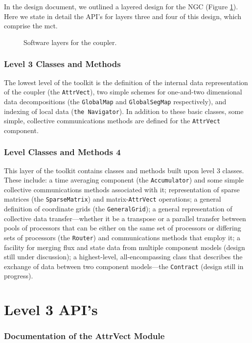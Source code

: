\documentclass{article}
\begin{document}
In the design document, we outlined a layered design for the 
NGC (Figure \ref{fig:coupler-layers}).  Here we state in detail 
the API's for layers three and four of this design, which comprise 
the mct.

\begin{figure}
\epsfxsize=6.0in
\centerline{ }
\caption{Software layers for the coupler.}
\label{fig:coupler-layers}
\end{figure}

\section{Level 3 Classes and Methods}
The lowest level of the toolkit is the definition of the internal 
data representation of the coupler (the {\tt AttrVect}), two simple 
schemes for one-and-two dimensional data decompositions (the 
{\tt GlobalMap} and {\tt GlobalSegMap} respectively), and indexing 
of local data ({\tt the Navigator}).  In addition to these basic 
classes, some simple, collective communications methods are defined
for the {\tt AttrVect} component.

\section{Level Classes and Methods 4}
This layer of the toolkit contains classes and methods built upon 
level 3  classes.  These include:  a time averaging component (the 
{\tt Accumulator}) and some simple collective communications 
methods associated with it; representation of sparse matrices 
(the {\tt SparseMatrix}) and matrix-{\tt AttrVect} operations;
a general definition of coordinate grids (the {\tt GeneralGrid});
a general representation of collective data transfer---whether it be 
a transpose or a parallel transfer between pools of processors that 
can be either on the same set of processors or differing sets of 
processors (the {\tt Router}) and communications methods that employ
it; a facility for merging flux and state data from multiple component 
models (design still under discussion); a highest-level, all-encompassing
 class that describes the exchange of data between two component 
models---the {\tt Contract} (design still in progress).


\part{Level 3 API's}
\section{Documentation of the AttrVect Module}

\end{document}
